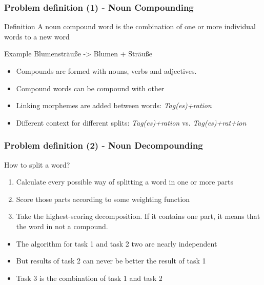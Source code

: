 \documentclass[accentcolor=tud9b, colorbacktitle, inverttitle]{tudbeamer}
\begin{document}
\begin{frame}
  \frametitle{Problem definition (1) - Noun Compounding}

  \begin{block}{Definition}
    A noun compound word is the combination of one or more individual words to a new word
  \end{block}

  \begin{block}{Example}
    Blumensträuße -> Blumen + Sträuße
  \end{block}

  \begin{itemize}
    \item Compounds are formed with nouns, verbs and adjectives.
    \item Compound words can be compound with other
    \item Linking morphemes are added between words:
      \emph{Tag(es)+ration}
    \item Different context for different splits: \emph{Tag(es)+ration}
      vs. \emph{Tag(es)+rat+ion}
  \end{itemize}
\end{frame}

\begin{frame}
  \frametitle{Problem definition (2) - Noun Decompounding}

  \begin{block}{How to split a word? \cite[Alfonseca et al.]{alf2008}}
    \begin{enumerate}
      \item Calculate every possible way of splitting a word in one or
        more parts
      \item Score those parts according to some weighting function
      \item Take the highest-scoring decomposition. If it contains one
        part, it means that the word in not a compound.
    \end{enumerate}
  \end{block}

  \begin{itemize}
    \item The algorithm for task 1 and task 2 two are nearly independent
    \item But results of task 2 can never be better the result of task 1
    \item Task 3 is the combination of task 1 and task 2
  \end{itemize}
\end{frame}
\end{document}
